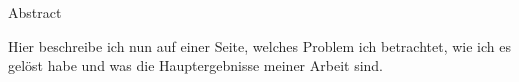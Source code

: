 \begin{center} 
\huge Abstract
\end{center}

Hier beschreibe ich nun auf einer Seite, welches Problem ich betrachtet, wie ich es gel\"ost habe
und was die Hauptergebnisse meiner Arbeit sind.

